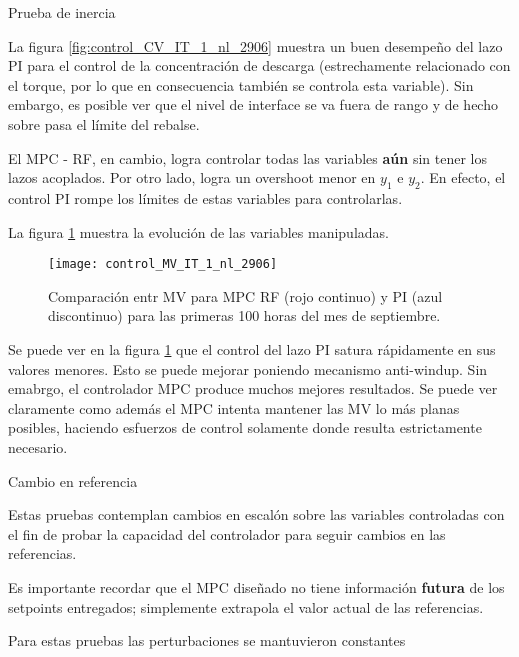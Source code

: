 \documentclass{beamer}
\begin{document}
\begin{myFrame}{Prueba de inercia}
\framebreak

La figura \ref{fig:control_CV_IT_1_nl_2906} muestra un buen desempeño del lazo PI para el control de la concentración de descarga (estrechamente relacionado con el torque, por lo que en consecuencia también se controla esta variable). Sin embargo, es posible ver que el nivel de interface se va fuera de rango y de hecho sobre pasa el límite del rebalse.

El MPC - RF, en cambio, logra controlar todas las variables \textbf{aún} sin tener los lazos acoplados. Por otro lado, logra un overshoot menor en $y_1$ e $y_2$. En efecto, el control PI rompe los límites de estas variables para controlarlas.

La figura \ref{fig:control_MV_IT_1_nl_2906} muestra la evolución de las variables manipuladas.
\framebreak
\begin{figure}[H]
\centering
\texttt{[image: control\_MV\_IT\_1\_nl\_2906]}
\caption{Comparación entr MV para MPC RF (rojo continuo) y PI (azul discontinuo) para las primeras 100 horas del mes de septiembre.}
\label{fig:control_MV_IT_1_nl_2906}
\end{figure}

\framebreak

Se puede ver en la figura \ref{fig:control_MV_IT_1_nl_2906} que el control del lazo PI satura rápidamente en sus valores menores. Esto se puede mejorar poniendo mecanismo anti-windup. Sin emabrgo, el controlador MPC produce muchos mejores resultados. Se puede ver claramente como además el MPC intenta mantener las MV lo más planas posibles, haciendo esfuerzos de control solamente donde resulta estrictamente necesario.

\end{myFrame}
\begin{myFrame}{Cambio en referencia}

Estas pruebas contemplan cambios en escalón sobre las variables controladas con el fin de probar la capacidad del controlador para seguir cambios en las referencias.

Es importante recordar que el MPC diseñado no tiene información \textbf{futura} de los setpoints entregados; simplemente extrapola el valor actual de las referencias.

Para estas pruebas las perturbaciones se mantuvieron constantes

\end{myFrame}
\end{document}
